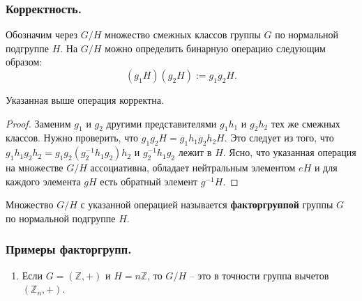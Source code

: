 \subsubsection{Корректность.}
Обозначим через $G / H$ множество смежных классов группы $G$ по нормальной подгруппе $H$. На $G / H$ можно определить бинарную операцию следующим образом:
\[
    (g_1H)(g_2H) := g_1g_2H.
\]
\begin{statement}
    Указанная выше операция корректна.
    \begin{proof}
        Заменим $g_1$ и $g_2$ другими представителями $g_1h_1$ и $g_2h_2$ тех же смежных классов. Нужно проверить, что $g_1g_2H = g_1h_1g_2h_2H$. Это следует из того, что $g_1h_1g_2h_2 = g_1g_2(g_2^{-1}h_1g_2)h_2$ и $g_2^{-1}h_1g_2$ лежит в $H$.
        Ясно, что указанная операция на множестве $G / H$ ассоциативна, обладает нейтральным элементом $eH$ и для каждого элемента $gH$ есть обратный элемент $g^{-1}H$.
    \end{proof}
\end{statement}
\begin{definition}
    Множество $G / H$ с указанной операцией называется \textbf{факторгруппой} группы $G$ по нормальной подгруппе $H$.
\end{definition}
\subsubsection{Примеры факторгрупп.}
\begin{enumerate}
    \item Если $G = (\mathbb{Z}, +)$ и $H = n\mathbb{Z}$, то $G/H$ -- это в точности группа вычетов $(\mathbb{Z}_n, +)$.
\end{enumerate}
